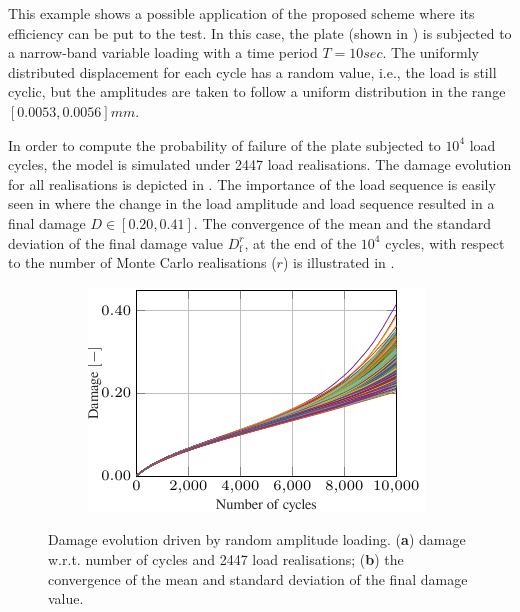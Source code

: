 This example shows a possible application of the proposed scheme where its efficiency can be put to the test. In this case, the plate (shown in ) is subjected to a narrow-band variable loading with a time period $T=10\unit{sec}$. The uniformly distributed displacement for each cycle has a random value, i.e., the load is still cyclic, but the amplitudes are taken to follow a uniform distribution in the range $[0.0053,0.0056]\unit{mm}$.

In order to compute the probability of failure of the plate subjected to $10^4$ load cycles, the model is simulated under 2447 load realisations. The damage evolution for all realisations is depicted in . The importance of the load sequence is easily seen in  where the change in the load amplitude and load sequence resulted in a final damage $D \in [0.20,0.41]$. The convergence of the mean and the standard deviation of the final damage value $D_{\mathrm{f}}^r$, at the end of the $10^4$ cycles, with respect to the number of Monte Carlo realisations ($r$) is illustrated in .
\begin{figure}[hbt!]
	\centering
	\begin{subfigure}[t]{0.49\linewidth}
		\includegraphics{./figures/semi_incremental/temporal_scheme_3_1.pdf}
		\caption{}
		\label{fig_random_damage}
	\end{subfigure}
	\hfil
	\begin{subfigure}[t]{0.49\linewidth}
		
		\caption{}
		\label{fig_random_convergence}
	\end{subfigure}
	\caption{Damage evolution driven by random amplitude loading. (\textbf{a}) damage w.r.t. number of cycles and 2447 load realisations; (\textbf{b}) the convergence of the mean and standard deviation of the final damage value.}
\end{figure}

